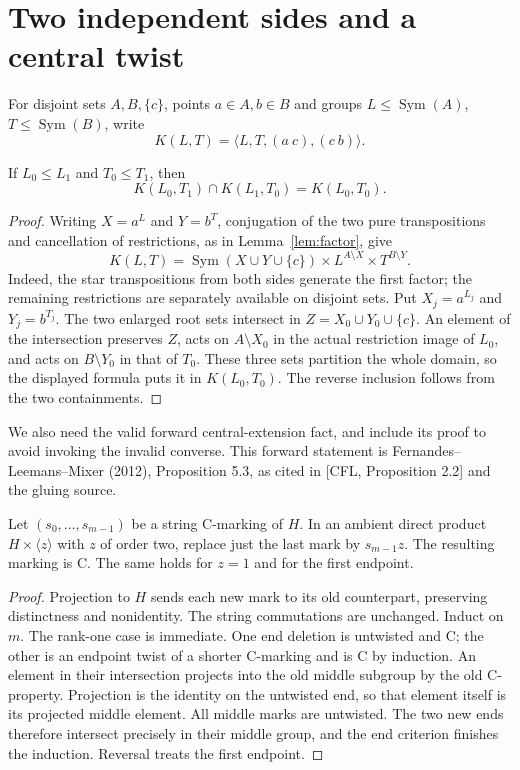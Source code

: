 \documentclass[a4paper,11pt]{article}
\newcommand{\Sym}{\operatorname{Sym}}\newcommand{\Alt}{\operatorname{Alt}}
\newcommand{\gen}[1]{\langle#1\rangle}
\begin{document}
\section{Two independent sides and a central twist}
For disjoint sets $A,B,\{c\}$, points $a\in A,b\in B$ and groups
$L\leq\Sym(A)$, $T\leq\Sym(B)$, write
\[
 K(L,T)=\gen{L,T,(a\ c),(c\ b)}.
\]
\begin{lemma}\label{lem:rectangle}
If $L_0\leq L_1$ and $T_0\leq T_1$, then
\[
 K(L_0,T_1)\cap K(L_1,T_0)=K(L_0,T_0).
\]
\end{lemma}
\begin{proof}
Writing $X=a^L$ and $Y=b^T$, conjugation of the two pure transpositions
and cancellation of restrictions, as in Lemma~\ref{lem:factor}, give
\[
 K(L,T)=\Sym(X\cup Y\cup\{c\})
 \times L^{A\setminus X}\times T^{B\setminus Y}.
\]
Indeed, the star transpositions from both sides generate the first factor;
the remaining restrictions are separately available on disjoint sets.
Put $X_j=a^{L_j}$ and $Y_j=b^{T_j}$. The two enlarged root sets
intersect in $Z=X_0\cup Y_0\cup\{c\}$. An element of the intersection
preserves $Z$, acts on $A\setminus X_0$ in the actual restriction image
of $L_0$, and acts on $B\setminus Y_0$ in that of $T_0$. These three
sets partition the whole domain, so the displayed formula puts it in
$K(L_0,T_0)$. The reverse inclusion follows from the two containments.
\end{proof}

We also need the valid forward central-extension fact, and include its
proof to avoid invoking the invalid converse. This forward statement is
Fernandes--Leemans--Mixer (2012), Proposition 5.3, as cited in [CFL,
Proposition 2.2] and the gluing source.
\begin{lemma}\label{lem:twist}
Let $(s_0,\ldots,s_{m-1})$ be a string C-marking of $H$. In an ambient
direct product $H\times\gen{z}$ with $z$ of order two, replace just the
last mark by $s_{m-1}z$. The resulting marking is C. The same holds for
$z=1$ and for the first endpoint.
\end{lemma}
\begin{proof}
Projection to $H$ sends each new mark to its old counterpart, preserving
distinctness and nonidentity. The string commutations are unchanged.
Induct on $m$. The rank-one case is immediate. One end deletion is
untwisted and C; the other is an endpoint twist of a shorter C-marking
and is C by induction. An element in their intersection projects into
the old middle subgroup by the old C-property. Projection is the identity
on the untwisted end, so that element itself is its projected middle
element. All middle marks are untwisted. The two new ends therefore
intersect precisely in their middle group, and the end criterion finishes
the induction. Reversal treats the first endpoint.
\end{proof}
\end{document}
